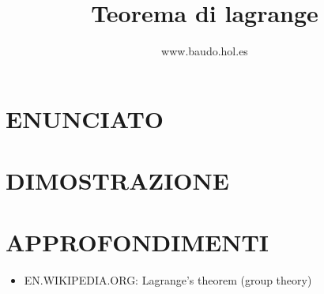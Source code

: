\documentclass[a4paper,10pt]{article}
\title{Teorema di lagrange}
\author{www.baudo.hol.es}
\begin{document}
\maketitle

\section{ENUNCIATO}

\section{DIMOSTRAZIONE}

\section{APPROFONDIMENTI}
\begin{itemize}
 \item EN.WIKIPEDIA.ORG: Lagrange's theorem (group theory) \cite{orderofgroup2}
\end{itemize}




\end{document}
